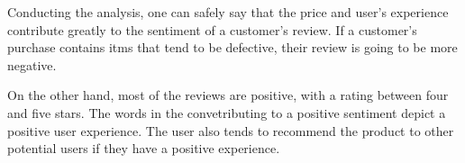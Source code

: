 \documentclass[
  11pt,
]{article}
\begin{document}
Conducting the analysis, one can safely say that the price and user's
experience contribute greatly to the sentiment of a customer's review.
If a customer's purchase contains itms that tend to be defective, their
review is going to be more negative.

On the other hand, most of the reviews are positive, with a rating
between four and five stars. The words in the convetributing to a
positive sentiment depict a positive user experience. The user also
tends to recommend the product to other potential users if they have a
positive experience.
\end{document}

